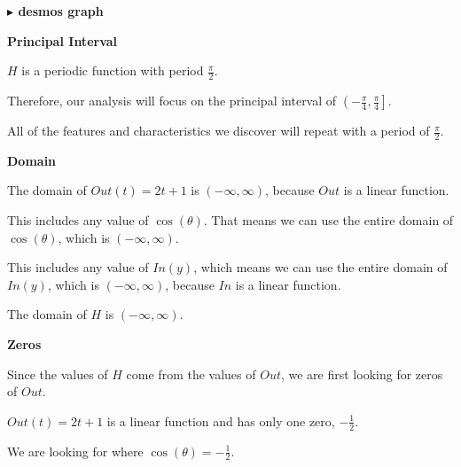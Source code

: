 \documentclass{ximera}
\begin{document}
\textbf{\textcolor{blue!55!black}{$\blacktriangleright$ desmos graph}} 
\begin{center}
\end{center}












\begin{observation} \textbf{\textcolor{-red!75}{Principal Interval}}

$H$ is a periodic function with period $\frac{\pi}{2}$. 


Therefore, our analysis will focus on the principal interval of $\left( -\frac{\pi}{4}, \frac{\pi}{4} \right]$. 


All of the features and characteristics we discover will repeat with a period of $\frac{\pi}{2}$.


\end{observation}














\textbf{\textcolor{blue!55!black}{Domain}}


The domain of $Out(t) = 2t + 1$ is $(-\infty, \infty)$, because $Out$ is a linear function.  

This includes any value of $\cos(\theta)$. That means we can use the entire domain of $\cos(\theta)$, which is $(-\infty, \infty)$.  


This includes any value of $In(y)$, which means we can use the entire domain of $In(y)$, which is $(-\infty, \infty)$, because $In$ is a linear function.  


The domain of $H$ is $(-\infty, \infty)$. 











\textbf{\textcolor{blue!55!black}{Zeros}}


Since the values of $H$ come from the values of $Out$, we are first looking for zeros of $Out$.  

$Out(t) = 2t + 1$ is a linear function and has only one zero, $-\frac{1}{2}$. 

We are looking for where $\cos(\theta) = -\frac{1}{2}$. 
\end{document}
